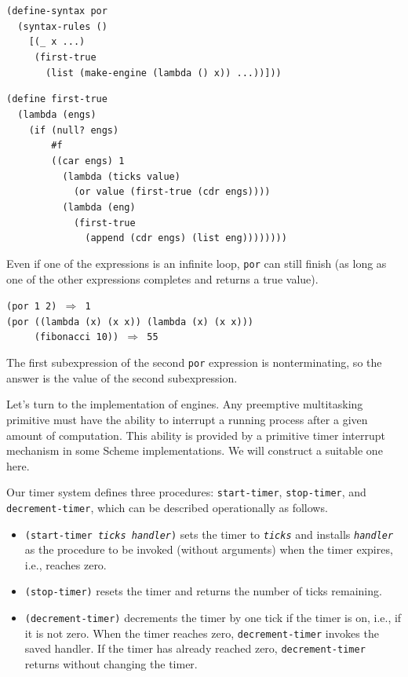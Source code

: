 \begin{alltt}
(define-syntax por
  (syntax-rules ()
    [(\_{} x ...)
     (first-true
       (list (make-engine (lambda () x)) ...))]))

(define first-true
  (lambda (engs)
    (if (null? engs)
        \#{}f
        ((car engs) 1
          (lambda (ticks value)
            (or value (first-true (cdr engs))))
          (lambda (eng)
            (first-true
              (append (cdr engs) (list eng))))))))
\end{alltt}


Even if one of the expressions is an infinite loop,
\texttt{por} can still finish (as long as one of the other expressions
completes and returns a true value).


\begin{alltt}
(por 1 2) \(\Rightarrow\) 1
(por ((lambda (x) (x x)) (lambda (x) (x x)))
     (fibonacci 10)) \(\Rightarrow\) 55
\end{alltt}


The first subexpression of the second \texttt{por} expression is
nonterminating, so the answer is the value of the second
subexpression.


Let's turn to the implementation of engines.
Any preemptive multitasking primitive must have the ability to
interrupt a running process after a given amount of computation.
This ability is provided by a primitive \label{examples_s97}timer
interrupt mechanism in some Scheme implementations.
We will construct a suitable one here.


Our timer system defines three procedures: \texttt{start-timer}, \texttt{stop-timer},
and \texttt{decrement-timer}, which can be described operationally as
follows.

\begin{itemize}
\item 
\texttt{(start-timer \textit{ticks} \textit{handler})}
sets the timer
to \texttt{\textit{ticks}} and installs \texttt{\textit{handler}} as the procedure to be
invoked (without arguments) when the timer expires, i.e., reaches zero.

\item 
\texttt{(stop-timer)}
resets the timer and returns the number of ticks remaining.

\item 
\texttt{(decrement-timer)}
decrements the timer by one tick if the timer is on, i.e., if it is
not zero.
When the timer reaches zero, \texttt{decrement-timer} invokes the saved
handler.
If the timer has already reached zero, \texttt{decrement-timer} returns
without changing the timer.

\end{itemize}


